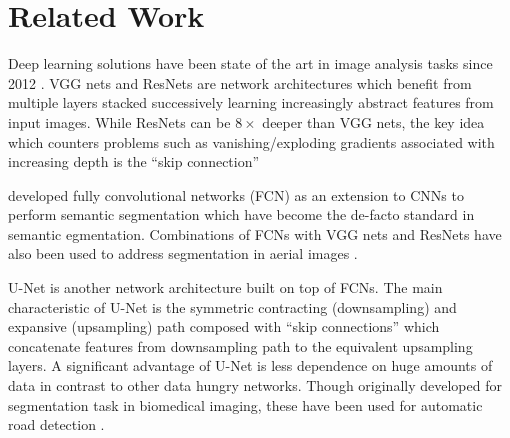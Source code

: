\section{Related Work}
\label{sec:related}


Deep learning solutions have been state of the art in image analysis tasks
since 2012 \cite{Kri12}. VGG nets \cite{Zis14} and ResNets \cite{He15} are
network architectures which benefit from multiple layers stacked successively
learning increasingly abstract features from input images. While ResNets can be
$8\times$ deeper than VGG nets, the key idea which counters problems such as
vanishing/exploding gradients associated with increasing depth is the ``skip
connection''

\citeauthor{Lon14} \cite{Lon14} developed fully convolutional networks (FCN) as
an extension to CNNs to perform semantic segmentation which have become the
de-facto standard in semantic egmentation. Combinations of FCNs with VGG nets
and ResNets have also been used to address segmentation in aerial images
\cite{Mar16} \cite{kai17} \cite{Azi18}.

U-Net is another network architecture built on top of FCNs. The main
characteristic of U-Net is the symmetric contracting (downsampling) and
expansive (upsampling) path composed with ``skip connections'' which
concatenate features from downsampling path to the equivalent upsampling
layers. A significant advantage of U-Net is less dependence on huge amounts of
data in contrast to other data hungry networks.  Though originally developed
for segmentation task in biomedical imaging, these have been used for automatic
road detection \cite{Zha17} \cite{Guo18}.


